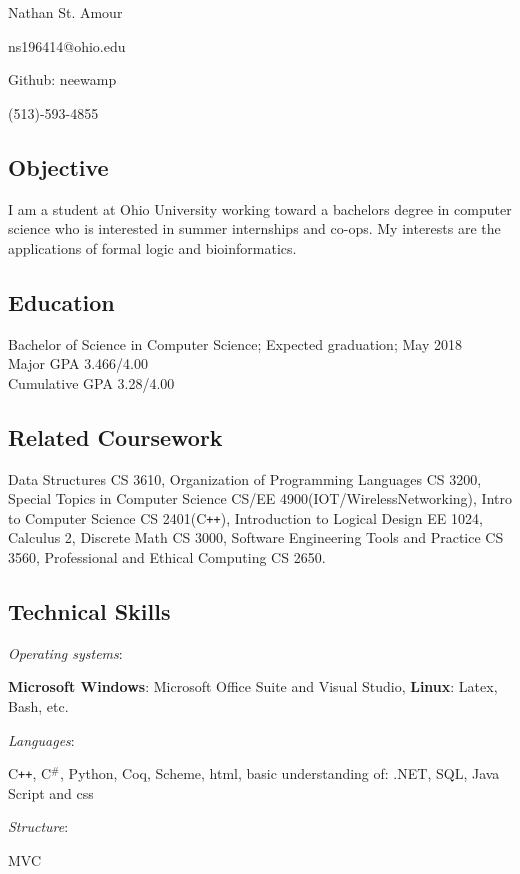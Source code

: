 \documentclass[11pt]{article} %
\newcommand{\name}[1]{
  \centerline{\Huge{#1}}
  }
\begin{document}
\thispagestyle{empty}
\name{Nathan St. Amour}
\begin{center}

 
 
\centerline{\large{ns196414@ohio.edu}}
\centerline{Github: neewamp}
\centerline{\large{(513)-593-4855}}

\end{center}
 \subsection*{Objective}
 I am a student at Ohio University working toward a bachelors degree in computer science who is interested in summer internships and co-ops.  My  interests are the applications of formal logic and bioinformatics.
  \subsection*{Education}
  Bachelor of Science in Computer Science; Expected graduation; May 2018\\
  Major GPA   3.466/4.00 \\
Cumulative GPA   3.28/4.00


\subsection*{Related Coursework}
Data Structures CS 3610, Organization of Programming Languages CS 3200, Special Topics in Computer Science CS/EE 4900(IOT/WirelessNetworking), Intro to Computer Science CS 2401(C\texttt{++}), Introduction to Logical Design EE 1024, Calculus 2, Discrete Math CS 3000, Software Engineering Tools and Practice CS 3560, Professional and Ethical Computing CS 2650.
\subsection*{Technical Skills}


\begin{bf}\emph {Operating systems}:\end{bf}\textbf { Microsoft Windows}: Microsoft Office Suite and Visual Studio, \textbf{Linux}:  Latex, Bash,  etc.\\
\begin{bf}\emph {Languages}:\end{bf} C\texttt{++}, C$^\texttt{\#}$, Python, Coq, Scheme,  html, basic understanding of: .NET, SQL, Java Script and css  \\ 
\begin{bf}\emph {Structure}:\end{bf} MVC
\end{document}
